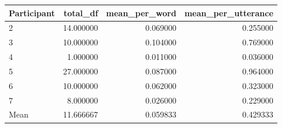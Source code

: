 \begin{tabular}{lrrr}
\toprule
Participant & total_df & mean_per_word & mean_per_utterance \\
\midrule
2 & 14.000000 & 0.069000 & 0.255000 \\
3 & 10.000000 & 0.104000 & 0.769000 \\
4 & 1.000000 & 0.011000 & 0.036000 \\
5 & 27.000000 & 0.087000 & 0.964000 \\
6 & 10.000000 & 0.062000 & 0.323000 \\
7 & 8.000000 & 0.026000 & 0.229000 \\
Mean & 11.666667 & 0.059833 & 0.429333 \\
\bottomrule
\end{tabular}
